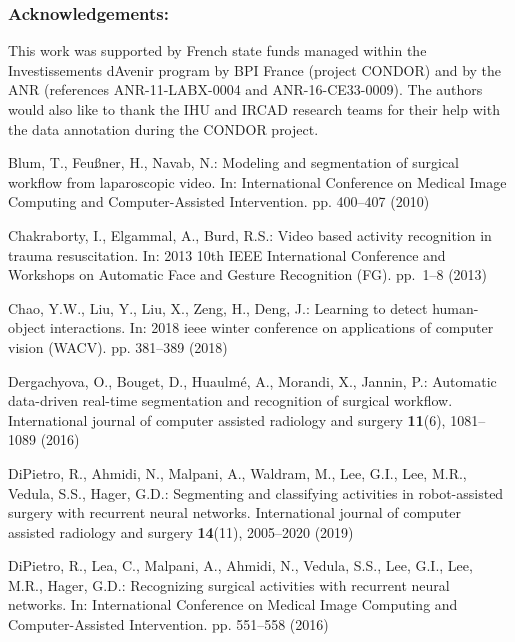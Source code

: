 \documentclass[english,runningheads,a4paper]{llncs}
\begin{document}
 \subsubsection{Acknowledgements: }
This work was supported by French state funds managed within the Investissements d\textsc{}Avenir program by BPI France (project CONDOR) and by the ANR (references ANR-11-LABX-0004 and ANR-16-CE33-0009).
The authors would also like to thank the IHU and IRCAD research teams for their help with the data annotation during the CONDOR project.

 

\begin{thebibliography}{10}
\providecommand{\url}[1]{\texttt{#1}}
\providecommand{\urlprefix}{URL }
\providecommand{\doi}[1]{https://doi.org/#1}

Blum, T., Feu{\ss}ner, H., Navab, N.: Modeling and segmentation of surgical
  workflow from laparoscopic video. In: International Conference on Medical
  Image Computing and Computer-Assisted Intervention. pp. 400--407 (2010)

Chakraborty, I., Elgammal, A., Burd, R.S.: Video based activity recognition in
  trauma resuscitation. In: 2013 10th IEEE International Conference and
  Workshops on Automatic Face and Gesture Recognition (FG). pp.~1--8 (2013)

Chao, Y.W., Liu, Y., Liu, X., Zeng, H., Deng, J.: Learning to detect
  human-object interactions. In: 2018 ieee winter conference on applications of
  computer vision (WACV). pp. 381--389 (2018)

Dergachyova, O., Bouget, D., Huaulm{\'e}, A., Morandi, X., Jannin, P.:
  Automatic data-driven real-time segmentation and recognition of surgical
  workflow. International journal of computer assisted radiology and surgery
  \textbf{11}(6),  1081--1089 (2016)

DiPietro, R., Ahmidi, N., Malpani, A., Waldram, M., Lee, G.I., Lee, M.R.,
  Vedula, S.S., Hager, G.D.: Segmenting and classifying activities in
  robot-assisted surgery with recurrent neural networks. International journal
  of computer assisted radiology and surgery  \textbf{14}(11),  2005--2020
  (2019)

DiPietro, R., Lea, C., Malpani, A., Ahmidi, N., Vedula, S.S., Lee, G.I., Lee,
  M.R., Hager, G.D.: Recognizing surgical activities with recurrent neural
  networks. In: International Conference on Medical Image Computing and
  Computer-Assisted Intervention. pp. 551--558 (2016)


\end{thebibliography}
\end{document}
